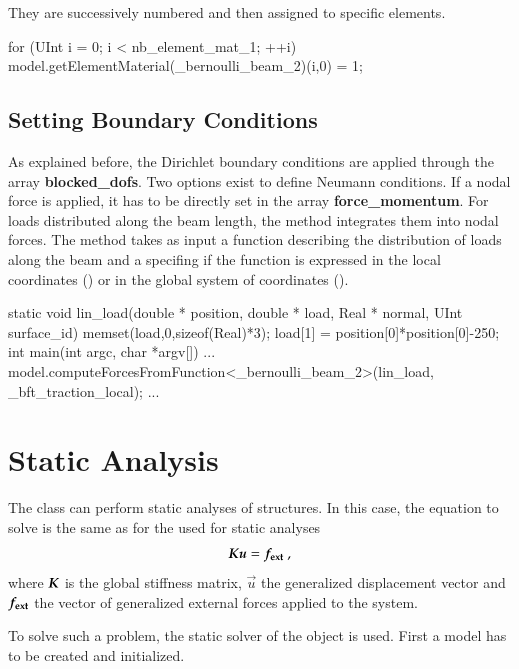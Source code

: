 They are successively numbered and then assigned to specific elements.
\begin{cpp}
for (UInt i = 0; i < nb_element_mat_1; ++i) {
    model.getElementMaterial(_bernoulli_beam_2)(i,0) = 1;
  }
\end{cpp}


\subsection{Setting Boundary Conditions}\label{sect:structMechMod:boundary}
As explained before, the Dirichlet boundary conditions are applied
through the array \textbf{blocked\_dofs}. Two options exist to define
Neumann conditions.  If a nodal force is applied, it has to be
directly set in the array \textbf{force\_momentum}. For loads
distributed along the beam length, the method
 integrates them into nodal forces.
The method takes as input a function describing the distribution of
loads along the beam and a  specifing if
the function is expressed in the local coordinates
() or in the global system of coordinates
().
\begin{cpp}
 static void lin_load(double * position, double * load,
		      Real * normal, UInt surface_id){
  memset(load,0,sizeof(Real)*3);
  load[1] = position[0]*position[0]-250;
}
int main(int argc, char *argv[]){
...
model.computeForcesFromFunction<_bernoulli_beam_2>(lin_load,
                                                   _bft_traction_local);
...}
\end{cpp}


\section{Static Analysis\label{sect:structMechMod:static}}

The  class can perform static analyses
of structures.  In this case, the equation to solve is the same as for
the  used for static analyses
\begin{equation}\label{eqn:structMechMod:static}
  \boldsymbol{K} \boldsymbol{u} = \boldsymbol{f_{{\mathrm{ext}}}}~,
\end{equation}
where $\boldsymbol{K}$ is the global stiffness matrix, $\vec{u}$ the
generalized displacement vector and $\boldsymbol{f_{{\mathrm{ext}}}}$ the vector of
generalized external forces applied to the system.

To solve such a problem, the static solver of the
 object
is used.  First a model has to be created and initialized.

